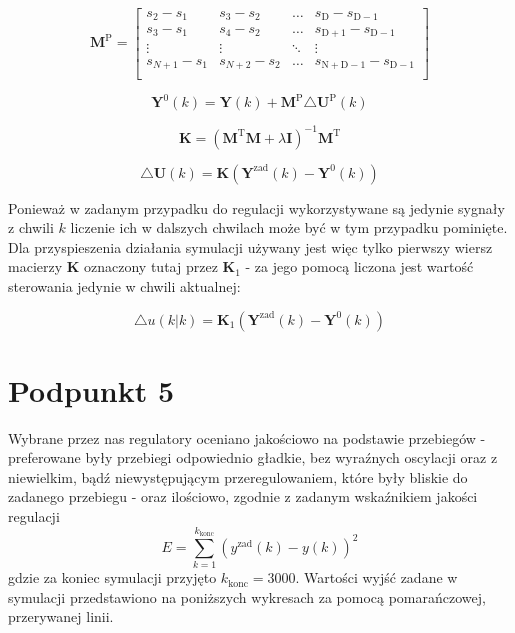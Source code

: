 \begin{equation}
\boldsymbol{M}^{\mathrm{P}}=\left[
\begin{array}
{cccc}
s_{2} - s_{1} & s_{3} - s_{2} & \ldots & s_{\mathrm{D}} - s_{\mathrm{D-1}}\\
s_{3} - s_{1} & s_{4} - s_{2} & \ldots & s_{\mathrm{D+1}} - s_{\mathrm{D-1}}\\
\vdots & \vdots & \ddots & \vdots\\
s_{N+1} - s_{1} & s_{N+2} - s_{2} & \ldots & s_{\mathrm{N+D-1}} - s_{\mathrm{D-1}}\\
\end{array}
\right]
\label{MParray}
\end{equation}

\begin{equation}
\boldsymbol{Y}^{0}(k) = \boldsymbol{Y}(k) + \boldsymbol{M}^{\mathrm{P}} \triangle \boldsymbol{U}^{\mathrm{P}}(k)
\label{Y0k}
\end{equation}

\begin{equation}
\boldsymbol{K} = (\boldsymbol{M}^{\mathrm{T}} \boldsymbol{M} + \lambda \boldsymbol{I})^{-1} \boldsymbol{M}^{\mathrm{T}}
\label{Karray}
\end{equation}

\begin{equation}
\triangle \boldsymbol{U}(k) = \boldsymbol{K}(\boldsymbol{Y}^{\mathrm{zad}}(k) - \boldsymbol{Y}^{0}(k))
\label{dukdmc}
\end{equation}

Ponieważ w zadanym przypadku do regulacji wykorzystywane są jedynie sygnały z chwili $k$ liczenie ich w dalszych chwilach może być w tym przypadku pominięte. Dla przyspieszenia działania symulacji używany jest więc tylko pierwszy wiersz macierzy $\boldsymbol{K}$ oznaczony tutaj przez $\boldsymbol{K}_1$ - za jego pomocą liczona jest wartość sterowania jedynie w chwili aktualnej:

\begin{equation}
	\triangle u(k|k) = \boldsymbol{K}_1 (\boldsymbol{Y}^{\mathrm{zad}}(k) - \boldsymbol{Y}^{0}(k))
\end{equation}

\chapter{Podpunkt 5}
Wybrane przez nas regulatory oceniano jakościowo na podstawie przebiegów - preferowane były przebiegi odpowiednio gładkie, bez wyraźnych oscylacji oraz z niewielkim, bądź niewystępującym przeregulowaniem, które były bliskie do zadanego przebiegu - oraz ilościowo, zgodnie z zadanym wskaźnikiem jakości regulacji
\begin{equation}
E = \sum_{k=1}^{k_{\mathrm{konc}}}(y^{\mathrm{zad}}(k) - y(k))^2
\label{E}
\end{equation}
gdzie za koniec symulacji przyjęto $k_{\mathrm{konc}}=3000$. Wartości wyjść zadane w symulacji przedstawiono na poniższych wykresach za pomocą pomarańczowej, przerywanej linii.

